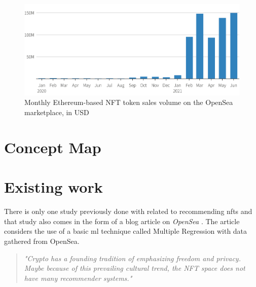 \begin{figure}[h!]
\centering
\includegraphics[width=12cm]{images/NFT-sales-opensea.png}
\caption{Monthly Ethereum-based NFT token sales volume on the OpenSea marketplace, in USD \autocite{howcroft_nft_2021}}
\end{figure}









\section{Concept Map}

\section{Existing work}

There is only one study previously done with related to recommending \gls{nft}s and that study also comes in the form of a blog article on \emph{OpenSea} \autocite{noauthor_what_2020}. The article considers the use of a basic \gls{ml} technique called Multiple Regression with data gathered from OpenSea.



\begin{quote} 
\centering 
\emph{"Crypto has a founding tradition of emphasizing freedom and privacy. Maybe because of this prevailing cultural trend, the NFT space does not have many recommender systems."} 
\\
\raggedleft
\autocite{noauthor_what_2020}
\end{quote}

